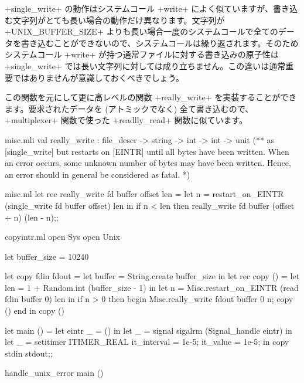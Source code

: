\ml+single_write+ の動作はシステムコール \ml+write+ によく似ていますが、書き込む文字列がとても長い場合の動作だけ異なります。文字列が \ml+UNIX_BUFFER_SIZE+ よりも長い場合一度のシステムコールで全てのデータを書き込むことができないので、システムコールは繰り返されます。そのためシステムコール \ml+write+ が持つ通常ファイルに対する書き込みの原子性は \ml+single_write+ では長い文字列に対しては成り立ちません。この違いは通常重要ではありませんが意識しておくべきでしょう。

この関数を元にして更に高レベルの関数 \ml+really_write+ を実装することができます。要求されたデータを (アトミックでなく) 全て書き込むので、\ml+multiplexer+ 関数で使った \ml+readlly_read+ 関数に似ています。
%
\begin{codefile}{misc.mli}
val really_write : file_descr -> string -> int -> int -> unit
(** as [single_write] but restarts on [EINTR] until all bytes have been
written. When an error occurs, some unknown number of bytes may have been
written. Hence, an error should in general be considered as fatal. *)
\end{codefile}
%
\begin{listingcodefile}{misc.ml}
let rec really_write fd buffer offset len =
  let n = restart_on_EINTR (single_write fd buffer offset) len in
  if n < len then really_write fd buffer (offset + n) (len - n);;
\end{listingcodefile}
%
\begin{codefile}{copyintr.ml}
open Sys
open Unix

let buffer_size = 10240

let copy fdin fdout =
  let buffer = String.create buffer_size in
  let rec copy ()  =
    let len = 1 + Random.int (buffer_size - 1) in
    let n = Misc.restart_on_EINTR (read fdin buffer 0) len in
    if n > 0 then
      begin
        Misc.really_write fdout buffer 0 n;
        copy ()
      end in
  copy ()

let main () =
  let eintr _ = () in
  let _ = signal sigalrm (Signal_handle eintr) in
  let _ = setitimer ITIMER_REAL { it_interval = 1e-5; it_value = 1e-5; } in
  copy stdin stdout;;

handle_unix_error main ()
\end{codefile}
%
